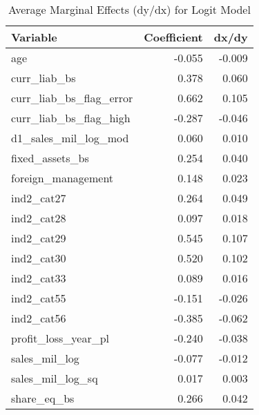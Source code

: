 \begin{table}

\caption{\label{tab:}Average Marginal Effects (dy/dx) for Logit Model}
\centering
\begin{tabular}[t]{l|r|r}
\hline
Variable & Coefficient & dx/dy\\
\hline
age & -0.055 & -0.009\\
\hline
curr\_liab\_bs & 0.378 & 0.060\\
\hline
curr\_liab\_bs\_flag\_error & 0.662 & 0.105\\
\hline
curr\_liab\_bs\_flag\_high & -0.287 & -0.046\\
\hline
d1\_sales\_mil\_log\_mod & 0.060 & 0.010\\
\hline
fixed\_assets\_bs & 0.254 & 0.040\\
\hline
foreign\_management & 0.148 & 0.023\\
\hline
ind2\_cat27 & 0.264 & 0.049\\
\hline
ind2\_cat28 & 0.097 & 0.018\\
\hline
ind2\_cat29 & 0.545 & 0.107\\
\hline
ind2\_cat30 & 0.520 & 0.102\\
\hline
ind2\_cat33 & 0.089 & 0.016\\
\hline
ind2\_cat55 & -0.151 & -0.026\\
\hline
ind2\_cat56 & -0.385 & -0.062\\
\hline
profit\_loss\_year\_pl & -0.240 & -0.038\\
\hline
sales\_mil\_log & -0.077 & -0.012\\
\hline
sales\_mil\_log\_sq & 0.017 & 0.003\\
\hline
share\_eq\_bs & 0.266 & 0.042\\
\hline
\end{tabular}
\end{table}